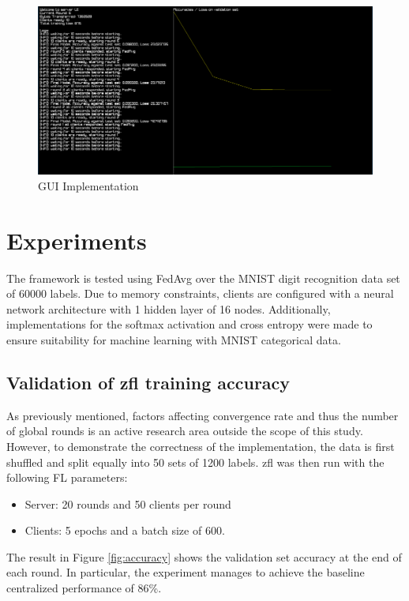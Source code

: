 \documentclass[12pt]{article}
\begin{document}
\begin{figure}
  \includegraphics[scale=0.3]{gui}
  \caption{GUI Implementation}
  \label{fig:gui}
\centering
\end{figure}

\pagebreak
\section{Experiments}\label{experiments}
The framework is tested using FedAvg over the MNIST digit recognition data set of 60000 labels. Due to memory
constraints, clients are configured with a neural network architecture with 1 hidden layer of 16
nodes. Additionally, implementations for the softmax activation and cross entropy were made to
ensure suitability for machine learning with MNIST categorical data.\\

\subsection{Validation of zfl training accuracy}
As previously mentioned, factors affecting convergence rate and thus the number of global rounds is an active research
area outside the scope of this study. However, to demonstrate the correctness of the implementation,
the data is first shuffled and split equally into 50 sets of 1200 labels.
zfl was then run with the following FL parameters:
\begin{itemize}
  \item Server: 20 rounds and 50 clients per round
  \item Clients: 5 epochs and a batch size of 600.
\end{itemize}
The result in Figure \ref{fig:accuracy} shows the
validation set accuracy at the end of each round. In particular, the experiment manages to achieve
the baseline centralized performance of 86\%.
\end{document}
